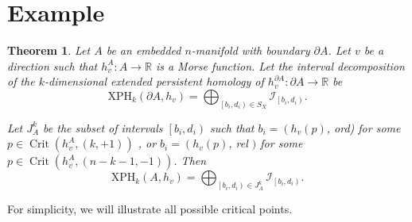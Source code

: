 \documentclass[a4paper]{article}
\theoremstyle{theorem}
\newtheorem{theorem}{Theorem}[section]
\theoremstyle{definition}
\theoremstyle{remark}
\theoremstyle{gremark}
\theoremstyle{discussion}
\theoremstyle{notation}
\begin{document}
	
	
	
\section*{Example}

\begin{theorem}
	Let $A$ be an embedded $n$-manifold with boundary $\partial A$. Let $v$ be a direction such that $h_v^{A}: A \rightarrow \mathbb{R}$ is a Morse function. Let the interval	decomposition of the $k$-dimensional extended persistent homology of $h_v^{\partial A}: \partial A \rightarrow \mathbb{R}$ be
	$$
	\mathrm{XPH}_k\left(\partial A, h_v\right)=\bigoplus_{\left[b_i, d_i\right) \in S_X} \mathcal{I}_{\left[b_i, d_i\right)} .
	$$
	
	Let $J_A^k$ be the subset of intervals $\left[b_i, d_i\right)$ such that $b_i=\left(h_v(p)\right.$, ord) for some $p \in \operatorname{Crit}\left(h_v^A,(k,+1)\right)$ , or $b_i=\left(h_v(p)\right.$, rel $)$ for some $p \in \operatorname{Crit}\left(h_v^A,(n-k-1,-1)\right)$. Then
	$$
	\mathrm{XPH}_k\left(A, h_v\right)=\bigoplus_{\left[b_i, d_i\right) \in J_A^k} \mathcal{I}_{\left[b_i, d_i\right)} .
	$$
\end{theorem}

For simplicity, we will illustrate all possible critical points.
\end{document}
